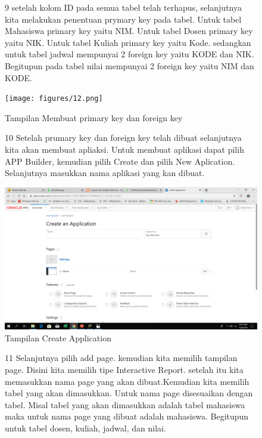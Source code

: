 \begin{enumerate}
\begin{figure}[!htbp]   
\item[9]setelah kolom ID pada semua tabel telah terhapus, selanjutnya kita melakukan penentuan prymary key pada tabel. Untuk tabel Mahasiswa primary key yaitu NIM. Untuk tabel Dosen primary key yaitu NIK. Untuk tabel Kuliah primary key yaitu Kode. sedangkan untuk tabel jadwal mempunyai 2 foreign key yaitu KODE dan NIK. Begitupun pada tabel nilai mempunyai 2 foreign key yaitu NIM dan KODE.


    \begin{center}
    \texttt{[image: figures/12.png]}
     \caption{Tampilan Membuat primary key dan foreign key}
    \end{center}   
    \end{figure}

\begin{figure}[!htbp]
\item[10]Setelah prumary key dan foreign key telah dibuat selanjutnya kita akan membuat apliaksi. Untuk membuat aplikasi dapat pilih APP Builder, kemudian pilih Create dan pilih New Aplication. Selanjutnya masukkan nama aplikasi yang kan dibuat.


    \begin{center}
    \includegraphics[scale=0.2]{figures/32.png}
     \caption{Tampilan Create Application}
    \end{center}   
    \end{figure}

\begin{figure}[!htbp]
\item[11]Selanjutnya pilih add page. kemudian kita memilih tampilan page. Disini kita memilih tipe Interactive Report. setelah itu kita memasukkan nama page yang akan dibuat.Kemudian kita memilih tabel yang akan dimasukkan. Untuk nama page disesuaikan dengan tabel. Misal tabel yang akan dimasukkan adalah tabel mahasiswa maka untuk nama page yang dibuat adalah mahasiswa. Begitupun untuk tabel dosen, kuliah, jadwal, dan nilai.


\end{figure}
\end{enumerate}
